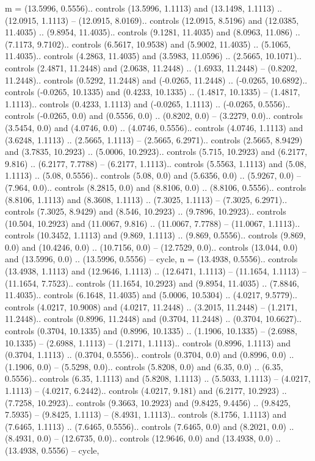 m = {(13.5996, 0.5556).. controls (13.5996, 1.1113) and (13.1498, 1.1113) .. (12.0915, 1.1113) -- (12.0915, 8.0169).. controls (12.0915, 8.5196) and (12.0385, 11.4035) .. (9.8954, 11.4035).. controls (9.1281, 11.4035) and (8.0963, 11.086) .. (7.1173, 9.7102).. controls (6.5617, 10.9538) and (5.9002, 11.4035) .. (5.1065, 11.4035).. controls (4.2863, 11.4035) and (3.5983, 11.0596) .. (2.5665, 10.1071).. controls (2.4871, 11.2448) and (2.0638, 11.2448) .. (1.6933, 11.2448) -- (0.8202, 11.2448).. controls (0.5292, 11.2448) and (-0.0265, 11.2448) .. (-0.0265, 10.6892).. controls (-0.0265, 10.1335) and (0.4233, 10.1335) .. (1.4817, 10.1335) -- (1.4817, 1.1113).. controls (0.4233, 1.1113) and (-0.0265, 1.1113) .. (-0.0265, 0.5556).. controls (-0.0265, 0.0) and (0.5556, 0.0) .. (0.8202, 0.0) -- (3.2279, 0.0).. controls (3.5454, 0.0) and (4.0746, 0.0) .. (4.0746, 0.5556).. controls (4.0746, 1.1113) and (3.6248, 1.1113) .. (2.5665, 1.1113) -- (2.5665, 6.2971).. controls (2.5665, 8.9429) and (3.7835, 10.2923) .. (5.0006, 10.2923).. controls (5.715, 10.2923) and (6.2177, 9.816) .. (6.2177, 7.7788) -- (6.2177, 1.1113).. controls (5.5563, 1.1113) and (5.08, 1.1113) .. (5.08, 0.5556).. controls (5.08, 0.0) and (5.6356, 0.0) .. (5.9267, 0.0) -- (7.964, 0.0).. controls (8.2815, 0.0) and (8.8106, 0.0) .. (8.8106, 0.5556).. controls (8.8106, 1.1113) and (8.3608, 1.1113) .. (7.3025, 1.1113) -- (7.3025, 6.2971).. controls (7.3025, 8.9429) and (8.546, 10.2923) .. (9.7896, 10.2923).. controls (10.504, 10.2923) and (11.0067, 9.816) .. (11.0067, 7.7788) -- (11.0067, 1.1113).. controls (10.3452, 1.1113) and (9.869, 1.1113) .. (9.869, 0.5556).. controls (9.869, 0.0) and (10.4246, 0.0) .. (10.7156, 0.0) -- (12.7529, 0.0).. controls (13.044, 0.0) and (13.5996, 0.0) .. (13.5996, 0.5556) -- cycle},
n = {(13.4938, 0.5556).. controls (13.4938, 1.1113) and (12.9646, 1.1113) .. (12.6471, 1.1113) -- (11.1654, 1.1113) -- (11.1654, 7.7523).. controls (11.1654, 10.2923) and (9.8954, 11.4035) .. (7.8846, 11.4035).. controls (6.1648, 11.4035) and (5.0006, 10.5304) .. (4.0217, 9.5779).. controls (4.0217, 10.9008) and (4.0217, 11.2448) .. (3.2015, 11.2448) -- (1.2171, 11.2448).. controls (0.8996, 11.2448) and (0.3704, 11.2448) .. (0.3704, 10.6627).. controls (0.3704, 10.1335) and (0.8996, 10.1335) .. (1.1906, 10.1335) -- (2.6988, 10.1335) -- (2.6988, 1.1113) -- (1.2171, 1.1113).. controls (0.8996, 1.1113) and (0.3704, 1.1113) .. (0.3704, 0.5556).. controls (0.3704, 0.0) and (0.8996, 0.0) .. (1.1906, 0.0) -- (5.5298, 0.0).. controls (5.8208, 0.0) and (6.35, 0.0) .. (6.35, 0.5556).. controls (6.35, 1.1113) and (5.8208, 1.1113) .. (5.5033, 1.1113) -- (4.0217, 1.1113) -- (4.0217, 6.2442).. controls (4.0217, 9.181) and (6.2177, 10.2923) .. (7.7258, 10.2923).. controls (9.3663, 10.2923) and (9.8425, 9.4456) .. (9.8425, 7.5935) -- (9.8425, 1.1113) -- (8.4931, 1.1113).. controls (8.1756, 1.1113) and (7.6465, 1.1113) .. (7.6465, 0.5556).. controls (7.6465, 0.0) and (8.2021, 0.0) .. (8.4931, 0.0) -- (12.6735, 0.0).. controls (12.9646, 0.0) and (13.4938, 0.0) .. (13.4938, 0.5556) -- cycle},
